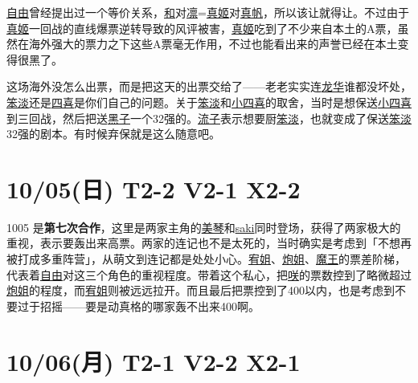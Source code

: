 \uline{自由}曾经提出过一个等价关系，\uline{和}对\uline{凛}=\uline{真姬}对\uline{真帆}，所以该让就得让。不过由于\uline{真姬}一回战的直线爆票逆转导致的风评被害，\uline{真姬}吃到了不少来自本土的A票，虽然在海外强大的票力之下这些A票毫无作用，不过也能看出来的声誉已经在本土变得很黑了。

这场海外没怎么出票，而是把这天的出票交给了——老老实实连\uline{龙华}谁都没坏处，\uline{笨淡}还是\uline{四喜}是你们自己的问题。关于\uline{笨淡}和\uline{小四喜}的取舍，当时是想保送\uline{小四喜}到三回战，然后把送\uline{黑子}一个32强的。\uline{流子}表示想要厨\uline{笨淡}，也就变成了保送\uline{笨淡}32强的剧本。有时候弃保就是这么随意吧。

\section{10/05(日) T2-2 V2-1 X2-2}


1005 是\textbf{第七次合作}，这里是两家主角的\uline{美琴}和\uline{saki}同时登场，获得了两家极大的重视，表示要轰出来高票。两家的连记也不是太死的，当时确实是考虑到「不想再被打成多重阵营」，从萌文到连记都是处处小心。\uline{宥姐}、\uline{炮姐}、\uline{魔王}的票差阶梯，代表着\uline{自由}对这三个角色的重视程度。带着这个私心，把\uline{咲}的票数控到了略微超过\uline{炮姐}的程度，而\uline{宥姐}则被远远拉开。而且最后把票控到了400以内，也是考虑到不要过于招摇——要是动真格的哪家轰不出来400啊。

\section{10/06(月) T2-1 V2-2 X2-1}


